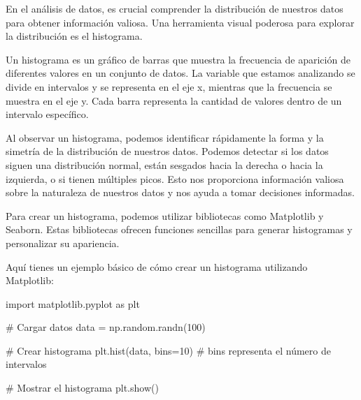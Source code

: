 \documentclass[
  a4paper,
]{article}
\newenvironment{Shaded}{}{}
\newcommand{\CommentTok}[1]{\textcolor[rgb]{0.42,0.45,0.49}{#1}}
\newcommand{\DecValTok}[1]{\textcolor[rgb]{0.00,0.36,0.77}{#1}}
\newcommand{\ImportTok}[1]{\textcolor[rgb]{0.01,0.18,0.38}{#1}}
\newcommand{\NormalTok}[1]{\textcolor[rgb]{0.14,0.16,0.18}{#1}}
\newcommand{\OperatorTok}[1]{\textcolor[rgb]{0.14,0.16,0.18}{#1}}
\begin{document}
En el análisis de datos, es crucial comprender la distribución de
nuestros datos para obtener información valiosa. Una herramienta visual
poderosa para explorar la distribución es el histograma.

Un histograma es un gráfico de barras que muestra la frecuencia de
aparición de diferentes valores en un conjunto de datos. La variable que
estamos analizando se divide en intervalos y se representa en el eje x,
mientras que la frecuencia se muestra en el eje y. Cada barra representa
la cantidad de valores dentro de un intervalo específico.

Al observar un histograma, podemos identificar rápidamente la forma y la
simetría de la distribución de nuestros datos. Podemos detectar si los
datos siguen una distribución normal, están sesgados hacia la derecha o
hacia la izquierda, o si tienen múltiples picos. Esto nos proporciona
información valiosa sobre la naturaleza de nuestros datos y nos ayuda a
tomar decisiones informadas.

Para crear un histograma, podemos utilizar bibliotecas como Matplotlib y
Seaborn. Estas bibliotecas ofrecen funciones sencillas para generar
histogramas y personalizar su apariencia.

Aquí tienes un ejemplo básico de cómo crear un histograma utilizando
Matplotlib:

\begin{Shaded}
\begin{Highlighting}[]
\ImportTok{import}\NormalTok{ matplotlib.pyplot }\ImportTok{as}\NormalTok{ plt}

\CommentTok{\# Cargar datos}
\NormalTok{data }\OperatorTok{=}\NormalTok{ np.random.randn(}\DecValTok{100}\NormalTok{)}

\CommentTok{\# Crear histograma}
\NormalTok{plt.hist(data, bins}\OperatorTok{=}\DecValTok{10}\NormalTok{)  }\CommentTok{\# bins representa el número de intervalos}

\CommentTok{\# Mostrar el histograma}
\NormalTok{plt.show()}
\end{Highlighting}
\end{Shaded}
\end{document}
